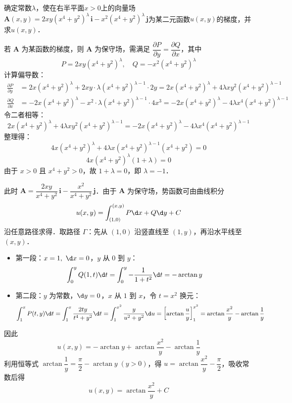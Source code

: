 \documentclass[12pt, a4paper, oneside, UTF8]{ctexbook}
\begin{document}
\begin{exercise}
    确定常数$\lambda$，使在右半平面$x>0$上的向量场$\bm{A}(x,y) = 2xy(x^4+y^2)^\lambda\, \bm{i}-x^2(x^4+y^2)^\lambda\,\bm{j}$为某二元函数$u(x,y)$的梯度，并求$u(x,y)$．
\end{exercise}
\begin{solution}
    若 $\bm{A}$ 为某函数的梯度，则 $\bm{A}$ 为保守场，需满足 $\dfrac{\partial P}{\partial y} = \dfrac{\partial Q}{\partial x}$，其中
    \[ P = 2xy(x^4+y^2)^\lambda,\quad Q = -x^2(x^4+y^2)^\lambda \]
    计算偏导数：
    \begin{align*}
        \frac{\partial P}{\partial y} &= 2x(x^4+y^2)^\lambda + 2xy\cdot\lambda(x^4+y^2)^{\lambda-1}\cdot 2y
            = 2x(x^4+y^2)^\lambda + 4\lambda xy^2(x^4+y^2)^{\lambda-1} \\
        \frac{\partial Q}{\partial x} &= -2x(x^4+y^2)^\lambda - x^2\cdot\lambda(x^4+y^2)^{\lambda-1}\cdot 4x^3
            = -2x(x^4+y^2)^\lambda - 4\lambda x^4(x^4+y^2)^{\lambda-1}
    \end{align*}
    令二者相等：
    \[ 2x(x^4+y^2)^\lambda + 4\lambda xy^2(x^4+y^2)^{\lambda-1}
        = -2x(x^4+y^2)^\lambda - 4\lambda x^4(x^4+y^2)^{\lambda-1} \]
    整理得：
    \[ 4x(x^4+y^2)^\lambda + 4\lambda x(x^4+y^2)^{\lambda-1}(x^4+y^2) = 0 \]
    \[ 4x(x^4+y^2)^\lambda(1+\lambda) = 0 \]
    由于 $x>0$ 且 $x^4+y^2>0$，故 $1+\lambda = 0$，即 $\boxed{\lambda = -1}$．

    此时 $\bm{A} = \dfrac{2xy}{x^4+y^2}\,\bm{i} - \dfrac{x^2}{x^4+y^2}\,\bm{j}$．由于 $\bm{A}$ 为保守场，势函数可由曲线积分
    \[ u(x,y) = \int_{(1,0)}^{(x,y)} P\d x + Q\d y + C\]
    沿任意路径求得．取路径 $\Gamma$：先从 $(1,0)$ 沿竖直线至 $(1,y)$，再沿水平线至 $(x,y)$．
    \begin{itemize}
        \item 第一段：$x=1,\ \d x=0$，$y$ 从 $0$ 到 $y$：
        \[ \int_0^y Q(1,t)\d t = \int_0^y -\frac{1}{1+t^2}\d t = -\arctan y \]
        \item 第二段：$y$ 为常数，$\d y=0$，$x$ 从 $1$ 到 $x$，令 $t = x^2$ 换元：
        \[ \int_1^x P(t,y)\d t = \int_1^x \frac{2ty}{t^4+y^2}\d t
           = \int_1^{x^2} \frac{y}{u^2+y^2}\d u
           = \left[\arctan\frac{u}{y}\right]_1^{x^2}
           = \arctan\frac{x^2}{y} - \arctan\frac{1}{y} \]
    \end{itemize}
    因此
    \[ u(x,y) = -\arctan y + \arctan\frac{x^2}{y} - \arctan\frac{1}{y} \]
    利用恒等式 $\arctan\dfrac{1}{y} = \dfrac{\pi}{2} - \arctan y\;(y>0)$，得 $u = \arctan\dfrac{x^2}{y} - \dfrac{\pi}{2}$，吸收常数后得
    \[ \boxed{u(x,y) = \arctan\frac{x^2}{y} + C} \]
\end{solution}
\end{document}
